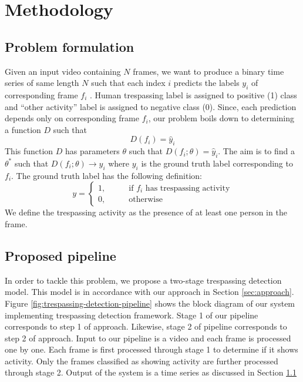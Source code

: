 \section{Methodology}
\subsection{Problem formulation}
\label{sec:prob-formulation}
Given an input video containing $N$ frames, we want to produce a binary time series of same length $N$ such that each index $i$ predicts the labels $y_i$ of corresponding frame $f_i$ . Human trespassing label is assigned to positive (1) class and ``other activity'' label is assigned to negative class (0). Since, each prediction depends only on corresponding frame $f_i$, our problem boils down to determining a function $D$ such that 
$$ D(f_i) = \hat{y}_i $$
This function $D$ has parameters $\theta$ such that $D(f_i;\theta) = \hat{y}_i$. The aim is to find a $\theta^*$ such that $D(f_i;\theta) \rightarrow y_i$ where $y_i$ is the ground truth label corresponding to $f_i$. The ground truth label has the following definition: 
$$y=
\begin{cases}
1,  &\qquad \textrm{if } f_i \textrm{ has trespassing activity} \\ 
0, 	&\qquad \textrm{otherwise}
\end{cases}
$$
We define the trespassing activity as the presence of at  least one person in the frame. 




\subsection{Proposed pipeline} 
In order to tackle this problem, we propose a two-stage trespassing detection model. This model is in accordance with our approach in Section \ref{sec:approach}. Figure \ref{fig:trespassing-detection-pipeline} shows the block diagram of our system implementing trespassing detection framework. Stage 1 of our pipeline corresponds to step 1 of approach. Likewise, stage 2 of pipeline corresponds to step 2 of approach. Input to our pipeline is a video and each frame is processed one by one. Each frame is first processed through stage 1 to determine if it shows activity. Only the frames classified as showing activity are further processed through stage 2. Output of the system is a time series as discussed in Section \ref{sec:prob-formulation}  



